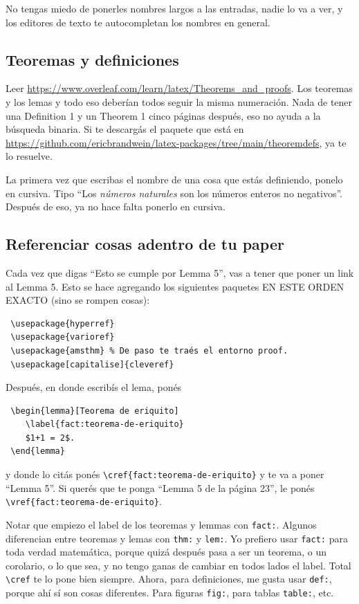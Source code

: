 \documentclass{article}
\begin{document}
No tengas miedo de ponerles nombres largos a las entradas, nadie lo va a ver, y los editores de texto te autocompletan los nombres en general.


\subsection{Teoremas y definiciones}
Leer \url{https://www.overleaf.com/learn/latex/Theorems_and_proofs}. Los teoremas y los lemas y todo eso deberían todos seguir la misma numeración. Nada de tener una Definition 1 y un Theorem 1 cinco páginas después, eso no ayuda a la búsqueda binaria. Si te descargás el paquete que está en \url{https://github.com/ericbrandwein/latex-packages/tree/main/theoremdefs}, ya te lo resuelve.

La primera vez que escribas el nombre de una cosa que estás definiendo, ponelo en cursiva. Tipo ``Los \emph{números naturales} son los números enteros no negativos''. Después de eso, ya no hace falta ponerlo en cursiva.


\subsection{Referenciar cosas adentro de tu paper}
Cada vez que digas ``Esto se cumple por Lemma 5'', vas a tener que poner un link al Lemma 5. Esto se hace agregando los siguientes paquetes EN ESTE ORDEN EXACTO (sino se rompen cosas):
\begin{verbatim}
 \usepackage{hyperref}
 \usepackage{varioref}
 \usepackage{amsthm} % De paso te traés el entorno proof.
 \usepackage[capitalise]{cleveref}
\end{verbatim}

Después, en donde escribís el lema, ponés

\begin{verbatim}
 \begin{lemma}[Teorema de eriquito]
    \label{fact:teorema-de-eriquito}
    $1+1 = 2$.
 \end{lemma}
\end{verbatim}

y donde lo citás ponés \verb|\cref{fact:teorema-de-eriquito}| y te va a poner ``Lemma 5''. Si querés que te ponga ``Lemma 5 de la página 23'', le ponés \verb|\vref{fact:teorema-de-eriquito}|.

Notar que empiezo el label de los teoremas y lemmas con \verb|fact:|. Algunos diferencian entre teoremas y lemas con \verb|thm:| y \verb|lem:|. Yo prefiero usar \verb|fact:| para toda verdad matemática, porque quizá después pasa a ser un teorema, o un corolario, o lo que sea, y no tengo ganas de cambiar en todos lados el label. Total \verb|\cref| te lo pone bien siempre. Ahora, para definiciones, me gusta usar \verb|def:|, porque ahí sí son cosas diferentes. Para figuras \verb|fig:|, para tablas \verb|table:|, etc.
\end{document}
